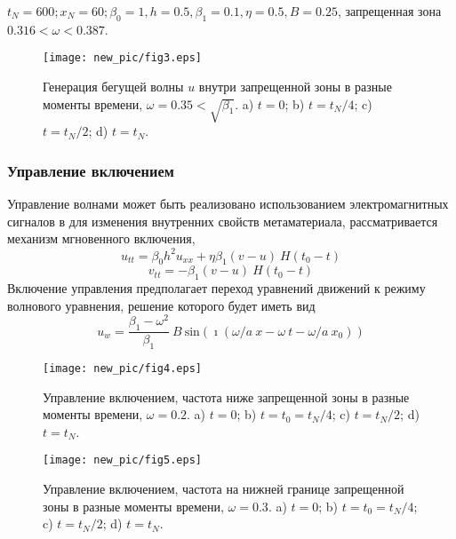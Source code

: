 \begin{frame}
	\begin{small}
		$t_N = 600; x_N = 60;\beta_0=1, h = 0.5, \beta_1 = 0.1, \eta = 0.5,  B=0.25$, запрещенная зона $0.316<\omega<0.387$.
	\end{small}
	\begin{figure}
		\begin{center}
			\texttt{[image: new\_pic/fig3.eps]}
		\end{center}
		Генерация бегущей волны $u$ внутри запрещенной зоны в разные моменты времени, $\omega = 0.35 < \sqrt{\beta_1}$.  a) $t=0$; b) $ t=t_N/4$; c) $t=t_N/2$; d) $t=t_N$.
	\end{figure}
\end{frame}

\begin{frame}
	\frametitle{Управление включением}
	Управление волнами может быть реализовано использованием электромагнитных сигналов в для изменения внутренних свойств метаматериала, рассматривается механизм мгновенного включения,
	$$
	u_{tt}=\beta_0 h^2 u_{xx}+\eta \beta_1 (v-u)~H(t_0-t)
	$$
	$$
	v_{tt}=-\beta_1 (v-u) ~H(t_0-t)
	$$
	Включение управления предполагает переход уравнений движений к режиму волнового уравнения, решение которого будет иметь вид
	$$
	u_w=\frac{\beta_1-\omega^2}{\beta_1}~B~{\text{sin}}  (\imath(\omega/a~ x - \omega~ t-\omega/a~ x_0))
	$$
\end{frame}

\begin{frame}
	\begin{figure}
		\begin{center}
			\texttt{[image: new\_pic/fig4.eps]}
		\end{center}
		Управление включением, частота ниже запрещенной зоны в разные моменты времени, $\omega = 0.2$.  a) $t=0$; b) $ t=t_0=t_N/4$; c) $t=t_N/2$; d) $t=t_N$.
	\end{figure}
\end{frame}

\begin{frame}
	\begin{figure}
		\begin{center}
			\texttt{[image: new\_pic/fig5.eps]}
		\end{center}
		Управление включением, частота на нижней границе запрещенной зоны в разные моменты времени, $\omega = 0.3$.  a) $t=0$; b) $ t=t_0=t_N/4$; c) $t=t_N/2$; d) $t=t_N$.
	\end{figure}
\end{frame}


